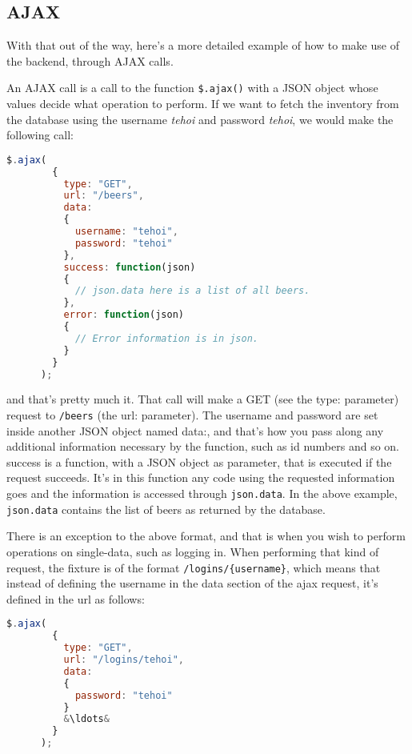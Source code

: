 \documentclass[a4paper]{article}
\begin{document}
\subsection{AJAX}
With that out of the way, here's a more detailed example of how to make use of the backend, through AJAX calls.

An AJAX call is a call to the function \texttt{\$.ajax()} with a JSON object whose values decide what operation to perform. 
If we want to fetch the inventory from the database using the username \textit{tehoi} and password \textit{tehoi}, we would make the following call:
\begin{lstlisting}[language=javascript, frame=single, showstringspaces = false, basicstyle=\small\ttfamily]
$.ajax(
        {
          type: "GET",
          url: "/beers",
          data:
          {
            username: "tehoi",
            password: "tehoi"
          },
          success: function(json)
          {
            // json.data here is a list of all beers.
          },
          error: function(json)
          {
            // Error information is in json.
          }
        }
      );
\end{lstlisting}
and that's pretty much it. That call will make a GET (see the type: parameter) request to \texttt{/beers} (the url: parameter). 
The username and password are set inside another JSON object named data:, and that's how you pass along any additional information necessary
by the function, such as id numbers and so on. success is a function, with a JSON object as parameter, that is executed if the request succeeds.
It's in this function any code using the requested information goes and the information is accessed through \texttt{json.data}. 
In the above example, \texttt{json.data} contains the list of beers as returned by the database.

There is an exception to the above format, and that is when you wish to perform operations on single-data, such as logging in. When performing 
that kind of request, the fixture is of the format \texttt{/logins/\{username\}}, which means that instead of defining the username in the
data section of the ajax request, it's defined in the url as follows:
\begin{lstlisting}[language=javascript, frame=single, showstringspaces = false, basicstyle=\small\ttfamily, escapechar=\&]
$.ajax(
        {
          type: "GET",
          url: "/logins/tehoi",
          data:
          {
            password: "tehoi"
          }
          &\ldots&
        }
      );
\end{lstlisting}
\end{document}
